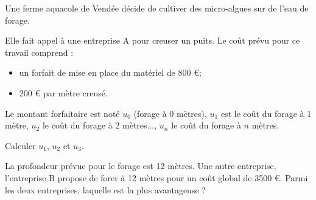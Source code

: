 \documentclass[a4paper,11pt]{exam}
\begin{document}
Une ferme aquacole de Vendée décide de cultiver des micro-algues sur de l'eau de forage.

Elle fait appel à une entreprise A pour creuser un puits. Le coût prévu pour ce travail comprend :
\begin{itemize}
	\item un forfait de mise en place du matériel de 800 €;
	\item 200 € par mètre creusé.	
\end{itemize}

Le montant forfaitaire est noté $u_0$ (forage à 0 mètres), $u_1$ est le coût du forage à 1 mètre, $u_2$ le coût du forage à 2 mètres..., $u_n$ le coût du forage à $n$ mètres.
\begin{questions}
	\question Calculer $u_1$, $u_2$ et $u_3$.
	\question
	
	\question La profondeur prévue pour le forage est 12 mètres. Une autre entreprise, l'entreprise B propose de forer à 12 mètres pour un coût global de \num{3500} €. Parmi les deux entreprises, laquelle est la plus avantageuse ?
\end{questions}
	\label{LastPage}
	
\end{document}
